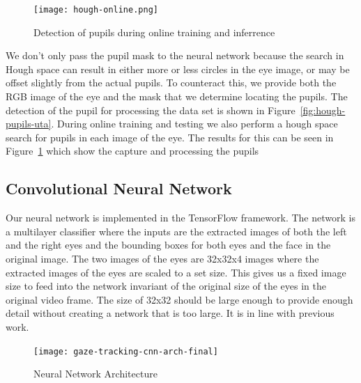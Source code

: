 \documentclass[10pt,twocolumn,letterpaper]{article}
\begin{document}
\begin{figure}[!h]
  \begin{center}
    \texttt{[image: hough-online.png]}
    \caption{Detection of pupils during online training and
      inferrence}
    \label{fig:hough-online}
  \end{center}
\end{figure}

We don't only pass the pupil mask
to the neural network because the search in Hough space can result in
either more or less circles in the eye image, or may be offset
slightly from the actual pupils. To counteract this, we provide both
the RGB image of the eye and the mask that we determine locating the
pupils. The detection of the pupil for processing the data set is shown in
Figure~\ref{fig:hough-pupils-uta}. During online training and testing
we also perform a hough space search for pupils in each image of the
eye. The results for this can be seen in Figure~\ref{fig:hough-online}
which show the capture and processing the pupils 

\subsection{Convolutional Neural Network}
Our neural network is implemented in the TensorFlow framework. The
network is a multilayer classifier where the inputs are the extracted
images of both the left and the right eyes and the bounding boxes for
both eyes and the face in the original image. The two images of the
eyes are 32x32x4 images where the extracted images of the eyes are
scaled to a set size. This gives us a fixed image size to feed into
the network invariant of the original size of the eyes in the original
video frame. The size of 32x32 should be large enough to provide
enough detail without creating a network that is too large. It is in
line with previous work. 

\begin{figure}
  \begin{center}
    \texttt{[image: gaze-tracking-cnn-arch-final]}
  \end{center}
  \caption{Neural Network Architecture}
  \label{fig.cnn-arch}
\end{figure}
\end{document}
